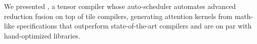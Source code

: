 We presented \NAME{}, a tensor compiler whose auto-scheduler automates advanced reduction fusion
on top of tile compilers, generating attention kernels from math-like specifications
that outperform state-of-the-art compilers and are on par with hand-optimized libraries.
